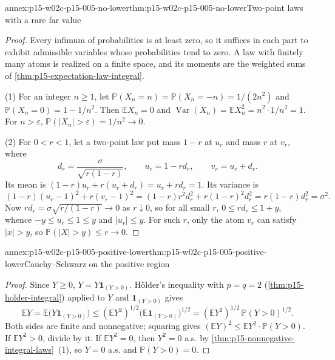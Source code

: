 \begin{annexitem}{annex:p15-w02c-p15-005-no-lower}{thm:p15-w02c-p15-005-no-lower}{Two-point laws with a rare far value}
\begin{proof}
Every infimum of probabilities is at least zero, so it suffices in each
part to exhibit admissible variables whose probabilities tend to zero.
A law with finitely many atoms is realized on a finite space, and its
moments are the weighted sums of \cref{thm:p15-expectation-law-integral}.

(1) For an integer \(n\geq1\), let
\(\mathbb P(X_n=n)=\mathbb P(X_n=-n)=1/(2n^2)\) and
\(\mathbb P(X_n=0)=1-1/n^2\). Then \(\mathbb EX_n=0\) and
\(\operatorname{Var}(X_n)=\mathbb EX_n^2=n^2\cdot1/n^2=1\). For
\(n>\varepsilon\), \(\mathbb P(|X_n|>\varepsilon)=1/n^2\to0\).

(2) For \(0<r<1\), let a two-point law put mass \(1-r\) at
\(u_r\) and mass \(r\) at \(v_r\), where
\[
 d_r=\frac{\sigma}{\sqrt{r(1-r)}},\qquad u_r=1-rd_r,\qquad v_r=u_r+d_r .
\]
Its mean is \((1-r)u_r+r(u_r+d_r)=u_r+rd_r=1\). Its variance is
\[
 (1-r)(u_r-1)^2+r(v_r-1)^2=(1-r)r^2d_r^2+r(1-r)^2d_r^2
 =r(1-r)d_r^2=\sigma^2 .
\]
Now \(rd_r=\sigma\sqrt{r/(1-r)}\to0\) as \(r\downarrow0\), so for all
small \(r\), \(0\leq rd_r\leq1+y\), whence
\(-y\leq u_r\leq1\leq y\) and \(|u_r|\leq y\). For such \(r\), only the
atom \(v_r\) can satisfy \(|x|>y\), so
\(\mathbb P(|X|>y)\leq r\to0\).
\end{proof}
\end{annexitem}

\begin{annexitem}{annex:p15-w02c-p15-005-positive-lower}{thm:p15-w02c-p15-005-positive-lower}{Cauchy--Schwarz on the positive region}
\begin{proof}
Since \(Y\geq0\), \(Y=Y\mathbf1_{(Y>0)}\). Hölder's inequality with
\(p=q=2\) (\cref{thm:p15-holder-integral}) applied to \(Y\) and
\(\mathbf1_{(Y>0)}\) gives
\[
 \mathbb EY=\mathbb E\bigl(Y\mathbf1_{(Y>0)}\bigr)
 \leq(\mathbb EY^2)^{1/2}\bigl(\mathbb E\mathbf1_{(Y>0)}\bigr)^{1/2}
 =(\mathbb EY^2)^{1/2}\,\mathbb P(Y>0)^{1/2}.
\]
Both sides are finite and nonnegative; squaring gives
\((\mathbb EY)^2\leq\mathbb EY^2\cdot\mathbb P(Y>0)\). If
\(\mathbb EY^2>0\), divide by it. If \(\mathbb EY^2=0\), then \(Y^2=0\)
a.s. by \cref{thm:p15-nonnegative-integral-laws}~(1), so \(Y=0\) a.s.
and \(\mathbb P(Y>0)=0\).
\end{proof}
\end{annexitem}

